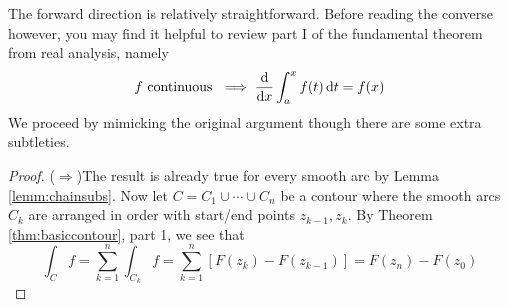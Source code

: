 The forward direction is relatively straightforward. Before reading the converse however, you may find it helpful to review part I of the fundamental theorem from real analysis, namely
\[f\text{ continuous }\implies\frac{\mathrm{d} }{\mathrm{d} x}\int_a^xf(t)\,{\mathrm{d} t}=f(x)\]
We proceed by mimicking the original argument though there are some extra subtleties.


\begin{proof}
($\Rightarrow$)\quad The result is already true for every smooth arc by Lemma \ref{lemm:chainsubs}. Now let $C=C_1\cup\cdots\cup C_n$ be a contour where the smooth arcs $C_k$ are arranged in order with start/end points $z_{k-1},z_k$. By Theorem \ref{thm:basiccontour}, part 1, we see that
\[\int_Cf=\sum_{k=1}^n\int_{C_k}f =\sum_{k=1}^n\left[F(z_k)-F(z_{k-1})\right] =F(z_n)-F(z_0)\]


\end{proof}
